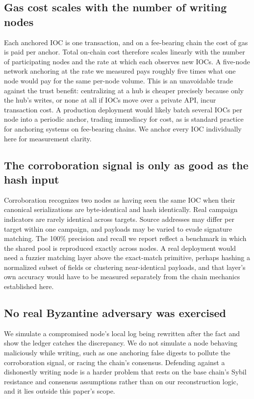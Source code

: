 \documentclass[conference]{IEEEtran}
\begin{document}
\subsection{Gas cost scales with the number of writing nodes}

Each anchored IOC is one transaction, and on a fee-bearing chain the cost of gas is paid per anchor. Total on-chain cost therefore scales linearly with the number of participating nodes and the rate at which each observes new IOCs. A five-node network anchoring at the rate we measured pays roughly five times what one node would pay for the same per-node volume. This is an unavoidable trade against the trust benefit: centralizing at a hub is cheaper precisely because only the hub's writes, or none at all if IOCs move over a private API, incur transaction cost. A production deployment would likely batch several IOCs per node into a periodic anchor, trading immediacy for cost, as is standard practice for anchoring systems on fee-bearing chains. We anchor every IOC individually here for measurement clarity.

\subsection{The corroboration signal is only as good as the hash input}

Corroboration recognizes two nodes as having seen the same IOC when their canonical serializations are byte-identical and hash identically. Real campaign indicators are rarely identical across targets. Source addresses may differ per target within one campaign, and payloads may be varied to evade signature matching. The 100\% precision and recall we report reflect a benchmark in which the shared pool is reproduced exactly across nodes. A real deployment would need a fuzzier matching layer above the exact-match primitive, perhaps hashing a normalized subset of fields or clustering near-identical payloads, and that layer's own accuracy would have to be measured separately from the chain mechanics established here.

\subsection{No real Byzantine adversary was exercised}

We simulate a compromised node's local log being rewritten after the fact and show the ledger catches the discrepancy. We do not simulate a node behaving maliciously while writing, such as one anchoring false digests to pollute the corroboration signal, or racing the chain's consensus. Defending against a dishonestly writing node is a harder problem that rests on the base chain's Sybil resistance and consensus assumptions rather than on our reconstruction logic, and it lies outside this paper's scope.
\end{document}
